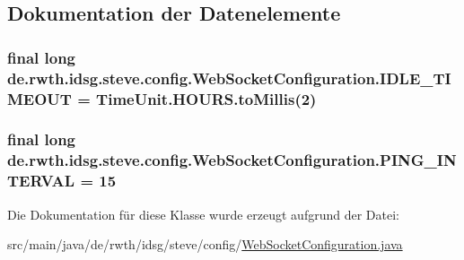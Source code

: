 \subsection{Dokumentation der Datenelemente}
\hypertarget{classde_1_1rwth_1_1idsg_1_1steve_1_1config_1_1_web_socket_configuration_a6a950c6ec954540c66dda295b8fb40b9}{
\subsubsection[{I\+D\+L\+E\+\_\+\+T\+I\+M\+E\+O\+U\+T}]{\setlength{\rightskip}{0pt plus 5cm}final long de.\+rwth.\+idsg.\+steve.\+config.\+Web\+Socket\+Configuration.\+I\+D\+L\+E\+\_\+\+T\+I\+M\+E\+O\+U\+T = Time\+Unit.\+H\+O\+U\+R\+S.\+to\+Millis(2)\hspace{0.3cm}{\ttfamily [static]}}}\label{classde_1_1rwth_1_1idsg_1_1steve_1_1config_1_1_web_socket_configuration_a6a950c6ec954540c66dda295b8fb40b9}
\hypertarget{classde_1_1rwth_1_1idsg_1_1steve_1_1config_1_1_web_socket_configuration_aa11b5dc252d4aa2d65e849afe891c1d3}{
\subsubsection[{P\+I\+N\+G\+\_\+\+I\+N\+T\+E\+R\+V\+A\+L}]{\setlength{\rightskip}{0pt plus 5cm}final long de.\+rwth.\+idsg.\+steve.\+config.\+Web\+Socket\+Configuration.\+P\+I\+N\+G\+\_\+\+I\+N\+T\+E\+R\+V\+A\+L = 15\hspace{0.3cm}{\ttfamily [static]}}}\label{classde_1_1rwth_1_1idsg_1_1steve_1_1config_1_1_web_socket_configuration_aa11b5dc252d4aa2d65e849afe891c1d3}


Die Dokumentation für diese Klasse wurde erzeugt aufgrund der Datei\+:\begin{DoxyCompactItemize}
\item 
src/main/java/de/rwth/idsg/steve/config/\hyperlink{_web_socket_configuration_8java}{Web\+Socket\+Configuration.\+java}\end{DoxyCompactItemize}
